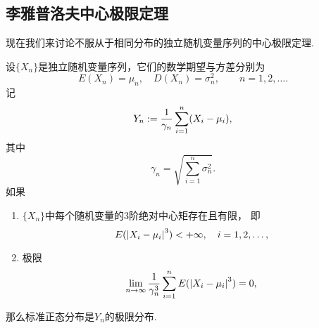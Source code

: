 \subsection{李雅普洛夫中心极限定理}
现在我们来讨论不服从于相同分布的独立随机变量序列的中心极限定理.

\begin{theorem}[李雅普洛夫中心极限定理]
设\(\{X_n\}\)是独立随机变量序列，它们的数学期望与方差分别为\begin{equation*}
	E(X_n) = \mu_n, \quad
	D(X_n) = \sigma_n^2,
	\qquad n=1,2,\dotsc.
\end{equation*}
记\begin{equation*}
	Y_n := \frac{1}{\gamma_n} \sum_{i=1}^n (X_i-\mu_i),
\end{equation*}
其中\begin{equation*}
	\gamma_n = \sqrt{\sum_{i=1}^n \sigma_n^2}.
\end{equation*}
如果\begin{enumerate}
	\item \(\{X_n\}\)中每个随机变量的3阶绝对中心矩存在且有限，
	即\begin{equation*}
		E(\abs{X_i-\mu_i}^3) < +\infty,
		\quad i=1,2,\dotsc,
	\end{equation*}

	\item 极限\begin{equation*}
		\lim_{n\to\infty} \frac{1}{\gamma_n^3}
			\sum_{i=1}^n E(\abs{X_i-\mu_i}^3)
		= 0,
	\end{equation*}
\end{enumerate}
那么标准正态分布是\(Y_n\)的极限分布.
\end{theorem}
